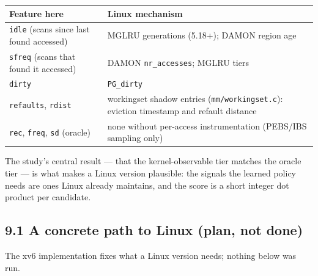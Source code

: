 \documentclass[10pt,a4paper]{article}
\newcommand{\code}[1]{\texttt{#1}}
\begin{document}
\begin{center}\footnotesize
\begin{tabularx}{\linewidth}{XX}
\toprule
\textbf{Feature here} & \textbf{Linux mechanism} \\ \midrule
\code{idle} (scans since last found accessed) & MGLRU generations (5.18+); DAMON region age \\
\code{sfreq} (scans that found it accessed) & DAMON \code{nr\_\allowbreak{}accesses}; MGLRU tiers \\
\code{dirty} & \code{PG\_\allowbreak{}dirty} \\
\code{refaults}, \code{rdist} & workingset shadow entries (\code{mm/\allowbreak{}workingset.\allowbreak{}c}): eviction timestamp and refault distance \\
\code{rec}, \code{freq}, \code{sd} (oracle) & none without per-access instrumentation (PEBS/IBS sampling only) \\
\bottomrule
\end{tabularx}
\end{center}

The study's central result — that the kernel-observable tier matches the oracle tier — is what makes a Linux version plausible: the signals the learned policy needs are ones Linux already maintains, and the score is a short integer dot product per candidate.

\subsection*{9.1 A concrete path to Linux (plan, not done)}

The xv6 implementation fixes what a Linux version needs; nothing below was run.
\end{document}

